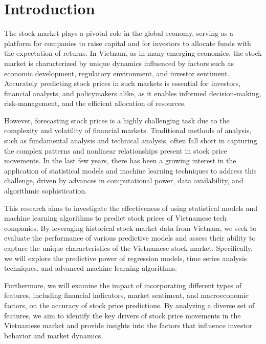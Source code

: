 \documentclass{ieeeojies}
\begin{document}
\titlepgskip=-15pt

\maketitle

\section{Introduction}
\label{sec:introduction}
The stock market plays a pivotal role in the global economy, serving as a platform for companies to raise capital and for investors to allocate funds with the expectation of returns. In Vietnam, as in many emerging economies, the stock market is characterized by unique dynamics influenced by factors such as economic development, regulatory environment, and investor sentiment. Accurately predicting stock prices in such markets is essential for investors, financial analysts, and policymakers alike, as it enables informed decision-making, risk-management, and the efficient allocation of resources.

However, forecasting stock prices is a highly challenging task due to the complexity and volatility of financial markets. Traditional methods of analysis, such as fundamental analysis and technical analysis, often fall short in capturing the complex patterns and nonlinear relationships present in stock price movements. In the last few years, there has been a growing interest in the application of statistical models and machine learning techniques to address this challenge, driven by advances in computational power, data availability, and algorithmic sophistication.

This research aims to investigate the effectiveness of using statistical models and machine learning algorithms to predict stock prices of Vietnamese tech companies. By leveraging historical stock market data from Vietnam, we seek to evaluate the performance of various predictive models and assess their ability to capture the unique characteristics of the Vietnamese stock market. Specifically, we will explore the predictive power of regression models, time series analysis techniques, and advanced machine learning algorithms.

Furthermore, we will examine the impact of incorporating different types of features, including financial indicators, market sentiment, and macroeconomic factors, on the accuracy of stock price predictions. By analyzing a diverse set of features, we aim to identify the key drivers of stock price movements in the Vietnamese market and provide insights into the factors that influence investor behavior and market dynamics.
\end{document}
